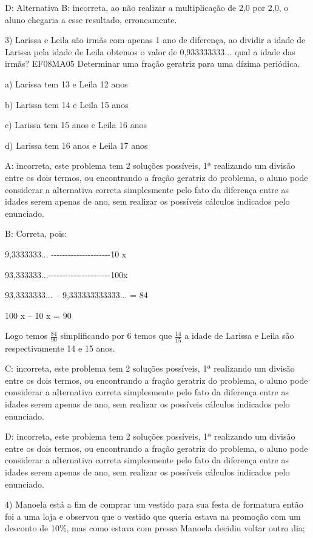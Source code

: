{D: Alternativa B: incorreta, ao não realizar a multiplicação de 2,0 por
2,0, o aluno chegaria a esse resultado, erroneamente.

3) Larissa e Leila são irmãs com apenas 1 ano de diferença, ao dividir a
idade de Larissa pela idade de Leila obtemos o valor de 0,933333333...
qual a idade das irmãs? EF08MA05 Determinar uma fração geratriz para uma
dízima periódica.

a) Larissa tem 13 e Leila 12 anos

b) Larissa tem 14 e Leila 15 anos

c) Larissa tem 15 anos e Leila 16 anos

d) Larissa tem 16 anos e Leila 17 anos

A: incorreta, este problema tem 2 soluções possíveis, 1ª realizando um
divisão entre os dois termos, ou encontrando a fração geratriz do
problema, o aluno pode considerar a alternativa correta simplesmente
pelo fato da diferença entre as idades serem apenas de ano, sem realizar
os possíveis cálculos indicados pelo enunciado.

B: Correta, pois:

9,3333333...
-\/-\/-\/-\/-\/-\/-\/-\/-\/-\/-\/-\/-\/-\/-\/-\/-\/-\/-\/-\/-10 x

93,333333...-\/-\/-\/-\/-\/-\/-\/-\/-\/-\/-\/-\/-\/-\/-\/-\/-\/-\/-\/-\/-\/-100x

93,3333333... -- 9,333333333333... = 84

100 x -- 10 x = 90

Logo temos \(\frac{84}{90}\) simplificando por 6 temos que
\(\frac{14}{15}\) a idade de Larissa e Leila são respectivamente 14 e 15
anos.

C: incorreta, este problema tem 2 soluções possíveis, 1ª realizando um
divisão entre os dois termos, ou encontrando a fração geratriz do
problema, o aluno pode considerar a alternativa correta simplesmente
pelo fato da diferença entre as idades serem apenas de ano, sem realizar
os possíveis cálculos indicados pelo enunciado.

D: incorreta, este problema tem 2 soluções possíveis, 1ª realizando um
divisão entre os dois termos, ou encontrando a fração geratriz do
problema, o aluno pode considerar a alternativa correta simplesmente
pelo fato da diferença entre as idades serem apenas de ano, sem realizar
os possíveis cálculos indicados pelo enunciado.

4) Manoela está a fim de comprar um vestido para sua festa de formatura
então foi a uma loja e observou que o vestido que queria estava na
promoção com um desconto de 10\%, mas como estava com pressa Manoela
decidiu voltar outro dia;

}
